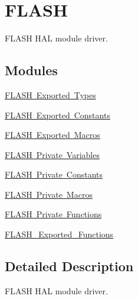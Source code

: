 \hypertarget{group___f_l_a_s_h}{}\section{F\+L\+A\+SH}
\label{group___f_l_a_s_h}


F\+L\+A\+SH H\+AL module driver.  


\subsection*{Modules}
\begin{DoxyCompactItemize}
\item 
\mbox{\hyperlink{group___f_l_a_s_h___exported___types}{F\+L\+A\+S\+H Exported Types}}
\item 
\mbox{\hyperlink{group___f_l_a_s_h___exported___constants}{F\+L\+A\+S\+H Exported Constants}}
\item 
\mbox{\hyperlink{group___f_l_a_s_h___exported___macros}{F\+L\+A\+S\+H Exported Macros}}
\item 
\mbox{\hyperlink{group___f_l_a_s_h___private___variables}{F\+L\+A\+S\+H Private Variables}}
\item 
\mbox{\hyperlink{group___f_l_a_s_h___private___constants}{F\+L\+A\+S\+H Private Constants}}
\item 
\mbox{\hyperlink{group___f_l_a_s_h___private___macros}{F\+L\+A\+S\+H Private Macros}}
\item 
\mbox{\hyperlink{group___f_l_a_s_h___private___functions}{F\+L\+A\+S\+H Private Functions}}
\item 
\mbox{\hyperlink{group___f_l_a_s_h___exported___functions}{F\+L\+A\+S\+H\+\_\+\+Exported\+\_\+\+Functions}}
\end{DoxyCompactItemize}


\subsection{Detailed Description}
F\+L\+A\+SH H\+AL module driver. 

